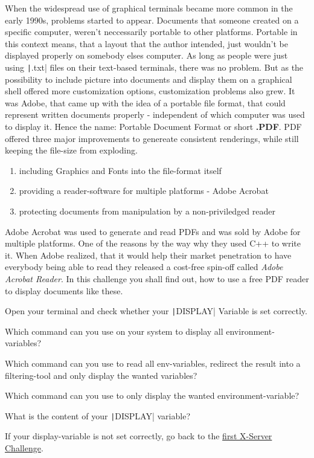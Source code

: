 \begin{challenge}
\begin{chadescription}
When the widespread use of graphical terminals became more common in the early 1990s, problems started to appear. 
Documents that someone created on a specific computer, weren't neccessarily portable to other platforms.
Portable in this context means, that a layout that the author intended, just wouldn't be displayed properly on somebody elses computer.
As long as people were just using \texttt|.txt| files on their text-based terminals, there was no problem. 
But as the possibility to include picture into documents and display them on a graphical shell offered more customization options, customization problems also grew. 
It was Adobe, that came up with the idea of a portable file format, that could represent written documents properly - independent of which computer was used to display it.
Hence the name: Portable Document Format or short \textbf{.PDF}. 
PDF offered three major improvements to genereate consistent renderings, while still keeping the file-size from exploding. 
\begin{enumerate}
\item including Graphics and Fonts into the file-format itself
\item providing a reader-software for multiple platforms - Adobe Acrobat
\item protecting documents from manipulation by a non-priviledged reader
\end{enumerate}

Adobe Acrobat was used to generate and read PDFs and was sold by Adobe for multiple platforms. 
One of the reasons by the way why they used C++ to write it.
When Adobe realized, that it would help their market penetration to have everybody being able to read they released a cost-free spin-off called \textit{Adobe Acrobat Reader}.
In this challenge you shall find out, how to use a free PDF reader to display documents like these. 
\end{chadescription}

\begin{task}
Open your terminal and check whether your \texttt|DISPLAY| Variable is set correctly.
\begin{questions}
\item Which command can you use on your system to display all environment-variables?
\item Which command can you use to read all env-variables, redirect the result into a filtering-tool and only display the wanted variables?
\item Which command can you use to only display the wanted environment-variable?
\item What is the content of your \texttt|DISPLAY| variable?
\end{questions}
If your display-variable is not set correctly, go back to the \href{https://www.github.com/STEMgraph/<uuid>}{first X-Server Challenge}.
\end{task}


\end{challenge}
